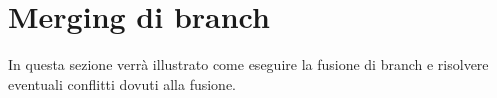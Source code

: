 \section{Merging di branch}
In questa sezione verrà illustrato come eseguire la fusione di branch e risolvere eventuali conflitti dovuti alla fusione.


